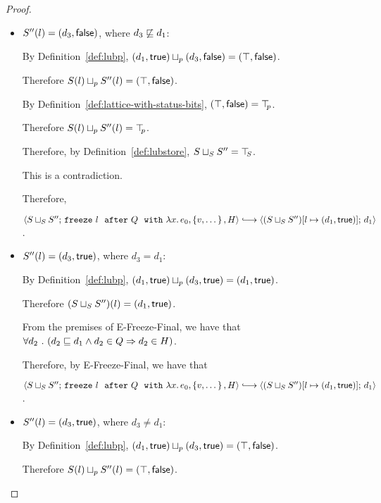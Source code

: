 \begin{proof}
\begin{itemize}
\begin{itemize}
\begin{itemize}
        \item $S''(l) = (d_3, \textsf{false})$, where $d_3 \not \sqsubseteq d_1$:

          By Definition~\ref{def:lubp},
          $(d_1, \textsf{true}) \sqcup_p (d_3, \textsf{false})
          = (\top, \textsf{false})$.

          Therefore $S(l) \sqcup_p S''(l) =
          (\top, \textsf{false})$.

          By Definition~\ref{def:lattice-with-status-bits},
          $(\top, \textsf{false}) = \top\hspace{-0.85mm}_{p}$.

          Therefore $S(l) \sqcup_p S''(l) = \top\hspace{-0.85mm}_{p}$.

          Therefore, by Definition~\ref{def:lubstore},
          $S \sqcup_{S} S'' = \top\hspace{-0.85mm}_{S}$.

          This is a contradiction.

          Therefore,

          $\config{\lubstore{S}{S''}}{\freezeafterfull{l}{Q}{\lam{x}{e_0}}{\setof{v,
                \dots}}{H}} \parstepsto
          \config{\extS{(\lubstore{S}{S''})}{l}{d_1}{\frozentrue}}{d_1}$.

        \item $S''(l) = (d_3, \textsf{true})$, where $d_3 = d_1$:

          By Definition~\ref{def:lubp},
          $(d_1, \textsf{true}) \sqcup_p (d_3, \textsf{true}) =
          (d_1, \textsf{true})$.

          Therefore $(S \sqcup_{S} S'')(l) = (d_1, \textsf{true})$.

          From the premises of {\sc E-Freeze-Final}, we have that
          $\forall{d_2} ~.~ ( {d_2 \sqsubseteq d_1 \land d_2 \in Q} \Rightarrow d_2 \in
          H)$.

          Therefore, by {\sc E-Freeze-Final}, we have that

          $\config{\lubstore{S}{S''}}{\freezeafterfull{l}{Q}{\lam{x}{e_0}}{\setof{v,
                \dots}}{H}} \parstepsto
          \config{\extS{(\lubstore{S}{S''})}{l}{d_1}{\frozentrue}}{d_1}$.

        \item $S''(l) = (d_3, \textsf{true})$, where $d_3 \neq d_1$:

          By Definition~\ref{def:lubp},
          $(d_1, \textsf{true}) \sqcup_p (d_3, \textsf{true})
          = (\top, \textsf{false})$.

          Therefore $S(l) \sqcup_p S''(l) = (\top, \textsf{false})$.


\end{itemize}
\end{itemize}
\end{itemize}
\end{proof}
